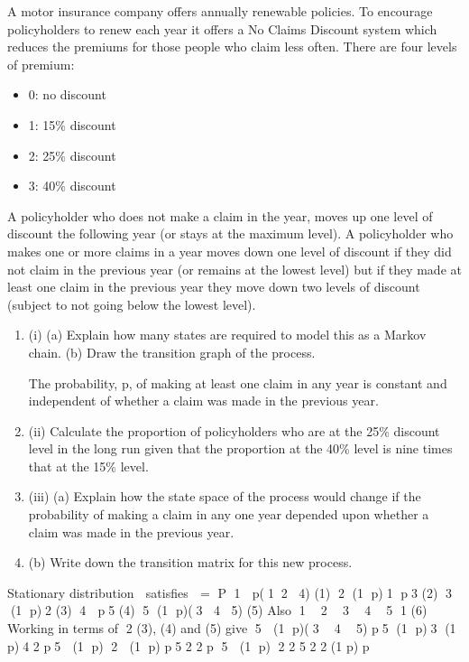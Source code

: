 \documentclass[a4paper,12pt]{article}
\begin{document}
A motor insurance company offers annually renewable policies. To encourage
policyholders to renew each year it offers a No Claims Discount system which reduces the premiums for those people who claim less often. There are four levels of premium:
\begin{itemize}
\item   0: no discount
\item 1: 15\% discount
\item 2: 25\% discount
\item 3: 40\% discount
\end{itemize}

A policyholder who does not make a claim in the year, moves up one level of discount the following year (or stays at the maximum level).
A policyholder who makes one or more claims in a year moves down one level of discount if they did not claim in the previous year (or remains at the lowest level) but if they made at least one claim in the previous year they move down two levels of
discount (subject to not going below the lowest level).
\begin{enumerate}
\item (i) (a) Explain how many states are required to model this as a Markov chain.
(b) Draw the transition graph of the process. \\
\smallskip


The probability, p, of making at least one claim in any year is constant and
independent of whether a claim was made in the previous year.
\item (ii) Calculate the proportion of policyholders who are at the 25\% discount level in
the long run given that the proportion at the 40\% level is nine times that at the
15\% level. 
\item (iii) (a) Explain how the state space of the process would change if the
probability of making a claim in any one year depended upon whether
a claim was made in the previous year.
\item (b) Write down the transition matrix for this new process. 
\end{enumerate}
\newpage


Stationary distribution  satisfies  = P
1  p(12 4) (1)
2 (1 p)1 p3 (2)
3 (1 p)2 (3)
4  p5 (4)
5 (1 p)(3 4 5) (5)
Also 1  2  3  4  5 1 (6)
Working in terms of 2
(3), (4) and (5) give 5  (1 p)(3  4  5)
p5 (1 p)3 (1 p)4
2
p5  (1 p) 2  (1 p) p5
2 2
p 5  (1 p) 2
2
5 2 2
(1 p)
p

  
\end{document}
